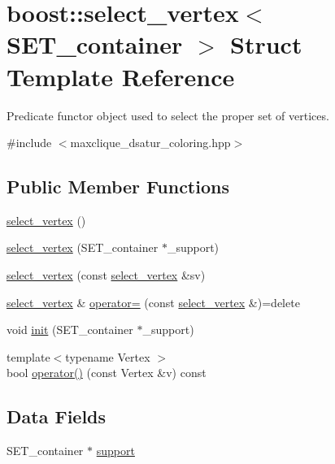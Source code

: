 \hypertarget{structboost_1_1select__vertex}{}\section{boost\+:\+:select\+\_\+vertex$<$ S\+E\+T\+\_\+container $>$ Struct Template Reference}
\label{structboost_1_1select__vertex}


Predicate functor object used to select the proper set of vertices.  




{\ttfamily \#include $<$maxclique\+\_\+dsatur\+\_\+coloring.\+hpp$>$}

\subsection*{Public Member Functions}
\begin{DoxyCompactItemize}
\item 
\hyperlink{structboost_1_1select__vertex_a86c63ba4306db2ef6f4d3f4179bbb964}{select\+\_\+vertex} ()
\item 
\hyperlink{structboost_1_1select__vertex_a89184c491c2e510c4aab5ab2603fbfe3}{select\+\_\+vertex} (S\+E\+T\+\_\+container $\ast$\+\_\+support)
\item 
\hyperlink{structboost_1_1select__vertex_a5e8210752adf6c4c04073821003ab208}{select\+\_\+vertex} (const \hyperlink{structboost_1_1select__vertex}{select\+\_\+vertex} \&sv)
\item 
\hyperlink{structboost_1_1select__vertex}{select\+\_\+vertex} \& \hyperlink{structboost_1_1select__vertex_a57cfd6e9139539475890bf7a4058a44d}{operator=} (const \hyperlink{structboost_1_1select__vertex}{select\+\_\+vertex} \&)=delete
\item 
void \hyperlink{structboost_1_1select__vertex_aa370748164daf475b88ddb2ea89e7faf}{init} (S\+E\+T\+\_\+container $\ast$\+\_\+support)
\item 
{\footnotesize template$<$typename Vertex $>$ }\\bool \hyperlink{structboost_1_1select__vertex_a6e1b7f835d8dd2f10a31c185d3cf2920}{operator()} (const Vertex \&v) const
\end{DoxyCompactItemize}
\subsection*{Data Fields}
\begin{DoxyCompactItemize}
\item 
S\+E\+T\+\_\+container $\ast$ \hyperlink{structboost_1_1select__vertex_a69e69a634885446fe889fde25d954fa5}{support}
\end{DoxyCompactItemize}



